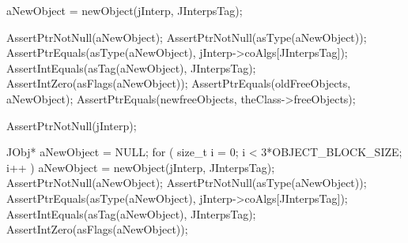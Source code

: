   aNewObject = newObject(jInterp, JInterpsTag);

  AssertPtrNotNull(aNewObject);
  AssertPtrNotNull(asType(aNewObject));
  AssertPtrEquals(asType(aNewObject), jInterp->coAlgs[JInterpsTag]);
  AssertIntEquals(asTag(aNewObject), JInterpsTag);
  AssertIntZero(asFlags(aNewObject));
  AssertPtrEquals(oldFreeObjects, aNewObject);
  AssertPtrEquals(newfreeObjects, theClass->freeObjects);
\stopCTest
\stopTestCase


\startCTest
  AssertPtrNotNull(jInterp);

  JObj* aNewObject = NULL;
  for ( size_t i = 0; i < 3*OBJECT_BLOCK_SIZE; i++ ) {
    aNewObject = newObject(jInterp, JInterpsTag);
  }
  AssertPtrNotNull(aNewObject);
  AssertPtrNotNull(asType(aNewObject));
  AssertPtrEquals(asType(aNewObject), jInterp->coAlgs[JInterpsTag]);
  AssertIntEquals(asTag(aNewObject), JInterpsTag);
  AssertIntZero(asFlags(aNewObject));
\stopCTest
\stopTestCase
\stopTestSuite
